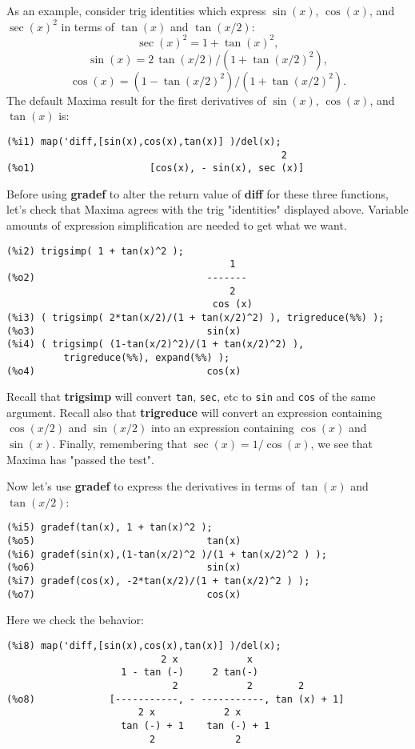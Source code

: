 \documentclass[12pt]{article}
\begin{document}
\smallskip
As an example, consider trig identities which express $\sin(x)$,  $\cos(x)$,
  and $\sec(x)^2$ in terms of $\tan(x)$ and $\tan(x/2)$:
\begin{equation}
\sec(x)^2 = 1 + \tan(x)^2,
\end{equation}
\begin{equation}
\sin(x) = 2 \, \tan(x/2) / (1 + \tan(x/2)^2 ) ,
\end{equation}
\begin{equation}
\cos(x) = ( 1 - \tan(x/2)^2 ) / ( 1 + \tan(x/2)^2 ) .
\end{equation}
The default Maxima result for the first derivatives of $\sin(x)$, $\cos(x)$,
  and $\tan(x)$ is:
\small
\begin{verbatim}
(%i1) map('diff,[sin(x),cos(x),tan(x)] )/del(x);
                                                2
(%o1)                    [cos(x), - sin(x), sec (x)]
\end{verbatim}
\normalsize
Before using \textbf{gradef} to alter the return value of \textbf{diff} for these
  three functions, let's check that Maxima agrees with the trig "identities" displayed
  above.
Variable amounts of expression simplification are needed to get what we want.
\small
\begin{verbatim}
(%i2) trigsimp( 1 + tan(x)^2 );
                                       1
(%o2)                              -------
                                       2
                                    cos (x)
(%i3) ( trigsimp( 2*tan(x/2)/(1 + tan(x/2)^2) ), trigreduce(%%) );
(%o3)                              sin(x)
(%i4) ( trigsimp( (1-tan(x/2)^2)/(1 + tan(x/2)^2) ),
          trigreduce(%%), expand(%%) );
(%o4)                              cos(x)									
\end{verbatim}
\normalsize
Recall that \textbf{trigsimp} will convert \verb|tan|, \verb|sec|, etc to
  \verb|sin| and \verb|cos| of the same argument.
Recall also that \textbf{trigreduce} will convert an expression containing
  $\cos(x/2)$  and $\sin(x/2)$ into an expression containing $\cos(x)$
  and $\sin(x)$.
Finally, remembering that $\sec(x) = 1/\cos(x)$, we see that Maxima has "passed
  the test".
  
\newpage

Now let's use \textbf{gradef} to express the derivatives in terms of
  $\tan(x)$ and $\tan(x/2)$:
\small
\begin{verbatim}
(%i5) gradef(tan(x), 1 + tan(x)^2 );
(%o5)                              tan(x)
(%i6) gradef(sin(x),(1-tan(x/2)^2 )/(1 + tan(x/2)^2 ) );
(%o6)                              sin(x)
(%i7) gradef(cos(x), -2*tan(x/2)/(1 + tan(x/2)^2 ) );
(%o7)                              cos(x)
\end{verbatim}
\normalsize
Here we check the behavior:
\small
\begin{verbatim}
(%i8) map('diff,[sin(x),cos(x),tan(x)] )/del(x);
                           2 x            x
                    1 - tan (-)     2 tan(-)
                             2            2        2
(%o8)             [-----------, - -----------, tan (x) + 1]
                       2 x            2 x
                    tan (-) + 1    tan (-) + 1
                         2              2
\end{verbatim}
\normalsize
\end{document}
